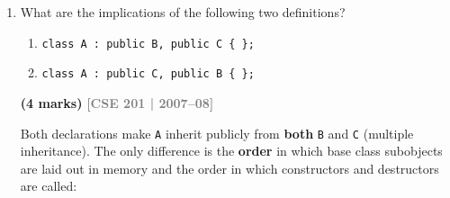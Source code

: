 \documentclass[12pt,a3paper]{article}
\newcommand{\yr}[1]{\hfill\textcolor{gray}{\small\textbf{[#1]}}}
\newcommand{\mk}[1]{\textcolor{orange!70!black}{\small\textbf{(#1 marks)}}}
\begin{document}
\begin{enumerate}
\begin{tcolorbox}
\textbf{Destructors \emph{can} (and often \emph{should}) be virtual:}

\begin{itemize}[itemsep=2pt]
  \item When a derived object is deleted through a base class pointer,
    the correct (most-derived) destructor must be called.
  \item Without a virtual destructor, only the base destructor is
    called --- the derived part is not cleaned up (memory/resource
    leak).
\end{itemize}

\begin{lstlisting}[language=C++]
class Base {
public:
    virtual ~Base(){ cout<<"Base dtor\n"; }  // MUST be virtual
};
class Der : public Base {
public:
    ~Der(){ cout<<"Der dtor\n"; }
};

int main(){
    Base* p = new Der();
    delete p;
    // With virtual dtor: "Der dtor", then "Base dtor"  -- correct
    // Without virtual:   "Base dtor" only              -- LEAK
}
\end{lstlisting}

\end{tcolorbox}


\item What are the implications of the following two definitions?
\begin{enumerate}
  \item \texttt{class A : public B, public C \{ \};}
  \item \texttt{class A : public C, public B \{ \};}
\end{enumerate}
\mk{4}
\yr{CSE 201 | 2007--08}
\begin{tcolorbox}[enhanced,breakable,ansbox,colback=cG!4,colframe=cG,
  boxrule=0.8pt,arc=5pt,
  title={\textbf{Answer --- Implications of class A : public B, public C vs class A : public C, public B}},
  fonttitle=\bfseries\color{white},colbacktitle=cG]

Both declarations make \texttt{A} inherit publicly from \textbf{both}
\texttt{B} and \texttt{C} (multiple inheritance).  The only
difference is the \textbf{order} in which base class subobjects are
laid out in memory and the order in which constructors and destructors
are called:


\end{tcolorbox}
\end{enumerate}
\end{document}
